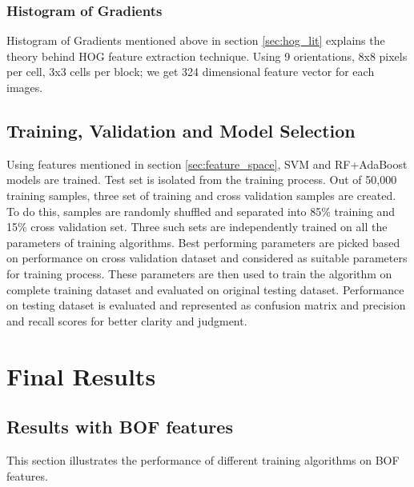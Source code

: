 \documentclass[12pt]{article}
\begin{document}
\subsubsection*{Histogram of Gradients}
Histogram of Gradients mentioned above in section \ref{sec:hog_lit} explains the theory behind HOG feature extraction technique. Using 9 orientations,  8x8 pixels per cell,  3x3 cells per block; we get 324 dimensional feature vector for each images.
\subsection{Training, Validation and Model Selection}
Using features mentioned in section \ref{sec:feature_space}, SVM and RF+AdaBoost models are trained. Test set is isolated from the training process. Out of 50,000 training samples, three set of training and cross validation samples are created. To do this, samples are randomly shuffled and separated into 85\% training and 15\% cross validation set. Three such sets are independently trained on all the parameters of training algorithms. Best performing parameters are picked based on performance on cross validation dataset and considered as suitable parameters for training process. These parameters are then used to train the algorithm on complete training dataset and evaluated on original testing dataset. Performance on testing dataset is evaluated and represented as confusion matrix and precision and recall scores for better clarity and judgment.





\section{Final Results}\label{sec:final_results}
\subsection{Results with BOF features}
This section illustrates the performance of different training algorithms on BOF features.
\end{document}
